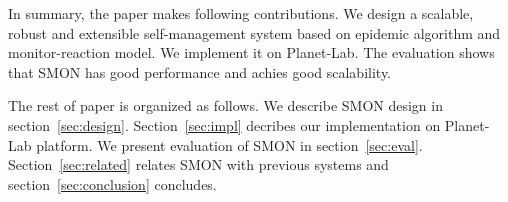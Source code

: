 

In summary, the paper makes following contributions.  We
design a scalable, robust and extensible self-management
system based on epidemic algorithm and monitor-reaction
model.  We implement it on Planet-Lab. The evaluation shows
that SMON has good performance and achies good scalability.

The rest of paper is organized as follows. We describe SMON
design in section~\ref{sec:design}. Section~\ref{sec:impl}
decribes our implementation on Planet-Lab platform. We
present evaluation of SMON in section~\ref{sec:eval}.
Section~\ref{sec:related} relates SMON with previous systems
and section~\ref{sec:conclusion} concludes.


